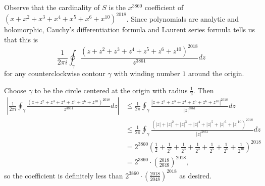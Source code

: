 Observe that the cardinality of $S$ is the $x^{3860}$ coefficient of $\left(x+x^2+x^3+x^4+x^5+x^6+x^{10}\right)^{2018}$. Since polynomials are analytic and holomorphic, Cauchy's differentiation formula and Laurent series formula tells us that this is \[\frac{1}{2\pi i}\displaystyle\oint_{\gamma}\frac{\left(z+z^2+z^3+z^4+z^5+z^6+z^{10}\right)^{2018}}{z^{3861}}dz\] for any counterclockwise contour $\gamma$ with winding number $1$ around the origin.

Choose $\gamma$ to be the circle centered at the origin with radius $\frac{1}{2}$. Then
\begin{align*}
	\left|\frac{1}{2\pi i}\displaystyle\oint_{\gamma}\frac{\left(z+z^2+z^3+z^4+z^5+z^6+z^{10}\right)^{2018}}{z^{3861}}dz\right|&\leq\frac{1}{2\pi}\displaystyle\oint_{\gamma}\frac{\left|z+z^2+z^3+z^4+z^5+z^6+z^{10}\right|^{2018}}{\left|z\right|^{3861}}dz\\
	&\leq\frac{1}{2\pi}\displaystyle\oint_{\gamma}\frac{\left(\left|z\right|+\left|z\right|^2+\left|z\right|^3+\left|z\right|^4+\left|z\right|^5+\left|z\right|^6+\left|z\right|^{10}\right)^{2018}}{\left|z\right|^{3861}}dz\\
	&=2^{3860}\left(\frac{1}{2}+\frac{1}{2^2}+\frac{1}{2^3}+\frac{1}{2^4}+\frac{1}{2^5}+\frac{1}{2^6}+\frac{1}{2^{10}}\right)^{2018}\\
	&=2^{3860}\cdot\left(\frac{2018}{2048}\right)^{2018},
\end{align*}
so the coefficient is definitely less than $2^{3860}\cdot\left(\frac{2018}{2048}\right)^{2018}$ as desired.